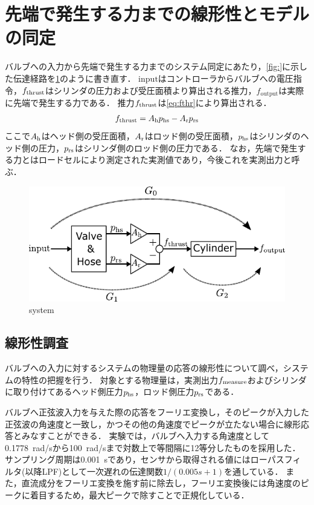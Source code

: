 \section{先端で発生する力までの線形性とモデルの同定}
\label{sec:力までの同定}
バルブへの入力から先端で発生する力までのシステム同定にあたり，\figname\ref{fig:}に示した伝達経路を\figname\ref{fig:system_dentatsu}のように書き直す．
$\mathrm{input}$はコントローラからバルブへの電圧指令，$f_\mathrm{thrust}$はシリンダの圧力および受圧面積より算出される推力，$f_\mathrm{output}$は実際に先端で発生する力である．
推力$f_\mathrm{thrust}$は\eqnname\ref{eq:fthr}により算出される．
\begin{align}
    \label{eq:fthr}
    f_\mathrm{thrust} = A_\mathrm{h}  p_\mathrm{hs} - A_\mathrm{r} p_\mathrm{rs}
\end{align}
ここで$A_\mathrm{h}$はヘッド側の受圧面積，$A_\mathrm{r}$はロッド側の受圧面積，$p_\mathrm{hs}$はシリンダのヘッド側の圧力，$p_\mathrm{rs}$はシリンダ側のロッド側の圧力である．
なお，先端で発生する力とはロードセルにより測定された実測値であり，今後これを実測出力と呼ぶ．
\begin{figure}[t]
    \centering
        \includegraphics[keepaspectratio, scale=1.0]{contents/SystemIdentification/figure/system_dentatsu.pdf}
        \caption{system}
        \label{fig:system_dentatsu}
\end{figure}

\subsection{線形性調査}
\label{sec:線形性調査(力)}
バルブへの入力に対するシステムの物理量の応答の線形性について調べ，システムの特性の把握を行う．
対象とする物理量は，実測出力$f_\mathrm{measure}$およびシリンダに取り付けてあるヘッド側圧力$p_\mathrm{hs}$，ロッド側圧力$p_\mathrm{rs}$である．

バルブへ正弦波入力を与えた際の応答をフーリエ変換し，そのピークが入力した正弦波の角速度と一致し，かつその他の角速度でピークが立たない場合に線形応答とみなすことができる．
実験では，バルブへ入力する角速度として\SI{0.1778}{rad/s}から\SI{100}{rad/s}まで対数上で等間隔に12等分したものを採用した．
サンプリング周期は\SI{0.001}{s}であり，センサから取得される値にはローパスフィルタ(以降LPF)として一次遅れの伝達関数${1}/(0.005s+1)$を通している．
また，直流成分をフーリエ変換を施す前に除去し，フーリエ変換後には角速度のピークに着目するため，最大ピークで除すことで正規化している．

